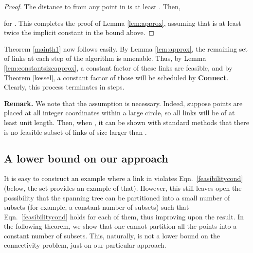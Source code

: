 \documentclass[11pt]{amsart}
\begin{document}
\begin{proof}
The distance to  from any point in  is at least . Then,

\iffalse

\fi
for . This completes the proof of Lemma \ref{lem:approx},
assuming that  is at least twice the implicit constant in
the bound above.
\end{proof}


Theorem \ref{mainth1} now follows easily. By Lemma \ref{lem:approx}, the remaining set of links at each step
of the algorithm is amenable. Thus, by Lemma
\ref{lem:constantsizeapprox}, a constant factor of these links are feasible, and by Theorem \ref{kessel}, a constant
factor of those will be scheduled by {\bf Connect}. Clearly, this process terminates in  steps.

\smallskip
\noindent
\textbf{Remark.} We note that the assumption  is necessary.
Indeed, suppose points are placed at all integer coordinates within a
large circle, so all links will be of at least unit length.
Then, when , it can be shown with standard methods that 
there is no feasible subset of links of size larger than .


\subsection{A lower bound on our approach}
It is easy to construct an example where a link in  violates
Eqn.~\ref{feasibilitycond} (below, the set  provides an example of that). However,
this still leaves open the possibility that the spanning tree can be partitioned into a small number
 of subsets (for example, a constant number of subsets) such that Eqn.~\ref{feasibilitycond} holds
for each of them, thus improving upon the  result. In the following theorem, we show that one
cannot partition all the points into a constant number of subsets. This, naturally, is not a lower bound
on the connectivity problem, just on our particular approach.
\end{document}
